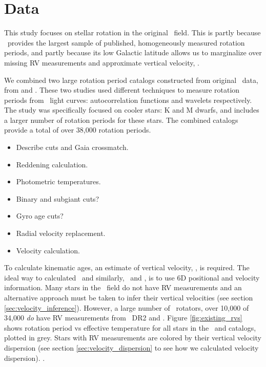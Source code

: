 \section{Data}
\label{sec:data}

This study focuses on stellar rotation in the original \kepler\ field.
This is partly because \kepler\ provides the largest sample of published,
homogeneously measured rotation periods, and partly because its low Galactic
latitude allows us to marginalize over missing RV measurements and approximate
vertical velocity, \vz.

We combined two large rotation period catalogs constructed from original
\kepler\ data, from \citet{mcquillan2014} and \citet{santos2019}.
These two studies used different techniques to measure rotation periods from
\kepler\ light curves: autocorrelation functions and wavelets respectively.
The \citet{santos2019} study was specifically focused on cooler stars: K and M
dwarfs, and includes a larger number of rotation periods for these stars.
The combined catalogs provide a total of over 38,000 rotation periods.

\begin{itemize}
    \item{Describe cuts and Gaia crossmatch.}
    \item{Reddening calculation.}
    \item{Photometric temperatures.}
    \item{Binary and subgiant cuts?}
    \item{Gyro age cuts?}
    \item{Radial velocity replacement.}
    \item{Velocity calculation.}
\end{itemize}

To calculate kinematic ages, an estimate of vertical velocity, \vz, is
required.
The ideal way to calculated \vz\, and similarly, \vx\ and \vy, is to use 6D
positional and velocity information.
Many stars in the \kepler\ field do not have RV measurements and an
alternative approach must be taken to infer their vertical velocities (see
section \ref{sec:velocity_inference}).
However, a large number of \kepler\ rotators, over 10,000 of 34,000 {\it do}
have RV measurements from \gaia\ DR2 and \lamost.
Figure \ref{fig:existing_rvs} shows rotation period vs effective temperature
for all stars in the \mct\ and \citet{santos2019} catalogs, plotted in grey.
Stars with RV measurements are colored by their vertical velocity dispersion
(see section \ref{sec:velocity_dispersion} to see how we calculated velocity
dispersion).
.

